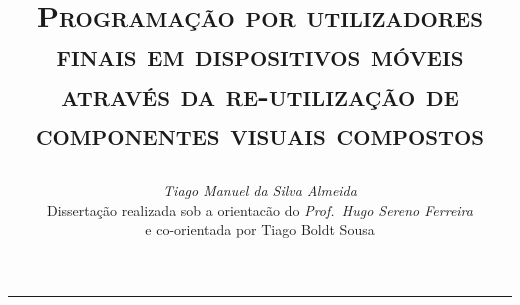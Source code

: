 \documentclass[9pt,a4paper]{extarticle}
\begin{document}
\title{\vspace*{-8mm}\textbf{\textsc{Programação por utilizadores finais em dispositivos móveis através da re-utilização de componentes visuais compostos}}
\author{\emph{Tiago Manuel da Silva Almeida}\\[2mm]
\small{Dissertação realizada sob a orientacão do \emph{Prof.\ Hugo Sereno Ferreira}}\\
\small{e co-orientada por Tiago Boldt Sousa}}}
\date{}
\maketitle
\thispagestyle{empty}

\vspace*{-4mm}\noindent\rule{\textwidth}{0.4pt}\vspace*{4mm}
\end{document}
